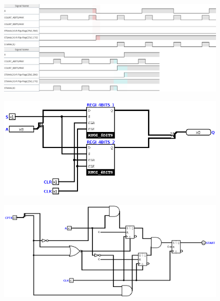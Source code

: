 \documentclass[a4paper]{article} %
\begin{document}
\begin{figure}[H]
\centering
    \includegraphics[width=.8\textwidth]{src/CHRONO_STAMAC_4_colorized.png}
    \label{fig:chrono_stamac}
\end{figure}

\begin{figure}[H]
\centering
    \includegraphics[width=.8\textwidth]{src/REGI_8BITS}
    \label{fig:regi8bits}
\end{figure}

\begin{figure}[H]
\centering
    \includegraphics[width=.8\textwidth]{src/START_BIT.png}
    \label{fig:startbit}
\end{figure}
\end{document}
